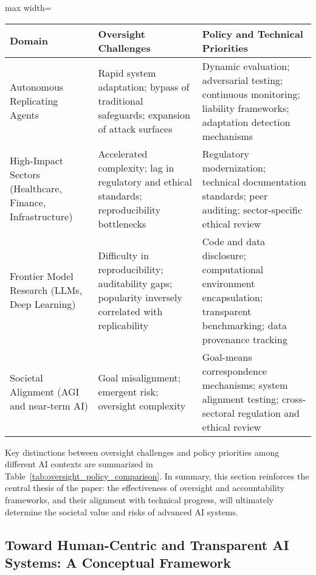 \documentclass[sigconf]{acmart}
\begin{document}
\begin{table*}[htbp]
\centering
\caption{Comparison of Oversight Challenges and Policy Priorities in AI Deployment}
\label{tab:oversight_policy_comparison}
\begin{adjustbox}{max width=\textwidth}
\begin{tabular}{lll}
\toprule
\textbf{Domain} & \textbf{Oversight Challenges} & \textbf{Policy and Technical Priorities} \\
\midrule
Autonomous Replicating Agents & Rapid system adaptation; bypass of traditional safeguards; expansion of attack surfaces & Dynamic evaluation; adversarial testing; continuous monitoring; liability frameworks; adaptation detection mechanisms \\
High-Impact Sectors (Healthcare, Finance, Infrastructure) & Accelerated complexity; lag in regulatory and ethical standards; reproducibility bottlenecks & Regulatory modernization; technical documentation standards; peer auditing; sector-specific ethical review \\
Frontier Model Research (LLMs, Deep Learning) & Difficulty in reproducibility; auditability gaps; popularity inversely correlated with replicability & Code and data disclosure; computational environment encapsulation; transparent benchmarking; data provenance tracking \\
Societal Alignment (AGI and near-term AI) & Goal misalignment; emergent risk; oversight complexity & Goal-means correspondence mechanisms; system alignment testing; cross-sectoral regulation and ethical review  \\
\bottomrule
\end{tabular}
\end{adjustbox}
\end{table*}

Key distinctions between oversight challenges and policy priorities among different AI contexts are summarized in Table~\ref{tab:oversight_policy_comparison}. In summary, this section reinforces the central thesis of the paper: the effectiveness of oversight and accountability frameworks, and their alignment with technical progress, will ultimately determine the societal value and risks of advanced AI systems.

\subsection{Toward Human-Centric and Transparent AI Systems: A Conceptual Framework}
\end{document}
